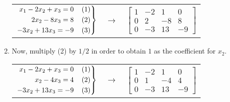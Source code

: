 \documentclass{article}
\newenvironment{rcases}
  {\left.\begin{aligned}}
  {\end{aligned}\right\rbrace}
\begin{document}
\begin{enumerate}
\begin{center}
\begin{tabular}{c c c}
            $\begin{rcases}
            x_1 - 2x_2 + x_3 = 0 \hspace{4mm} (1) \\  
            2x_2 - 8x_3 = 8 \hspace{4mm} (2) \\
            -3x_2 + 13x_3 = -9 \hspace{4mm} (3) \\ 
            \end{rcases}$

            & $\rightarrow$ &

            $\begin{bmatrix}
                1 & -2 & 1 & 0 \\
                0 & 2 & -8 & 8 \\
                0 & -3 & 13 & -9
            \end{bmatrix}$

        \end{tabular}
    \end{center}

    \item Now, multiply (2) by $1/2$ in order to obtain $1$ as the coefficient for $x_2$.
    \begin{center}
        \begin{tabular}{c c c}

            $\begin{rcases}
            x_1 - 2x_2 + x_3 = 0 \hspace{4mm} (1) \\  
            x_2 - 4x_3 = 4 \hspace{4mm} (2) \\
            -3x_2 + 13x_3 = -9 \hspace{4mm} (3) \\ 
            \end{rcases}$

            & $\rightarrow$ &

            $\begin{bmatrix}
                1 & -2 & 1 & 0 \\
                0 & 1 & -4 & 4 \\
                0 & -3 & 13 & -9
            \end{bmatrix}$

        \end{tabular}
    \end{center}


\end{enumerate}
\end{document}
